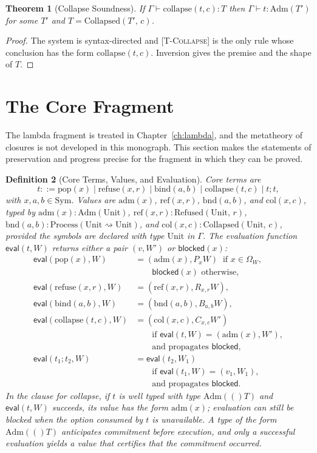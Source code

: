\documentclass[12pt,oneside,openany]{book}
\theoremstyle{spherepop}
\newtheorem{definition}{Definition}[chapter]
\newtheorem{theorem}[definition]{Theorem}
\theoremstyle{remarkstyle}
\newcommand{\Adm}[1]{\mathrm{Adm}(#1)}
\newcommand{\Refused}[2]{\mathrm{Refused}(#1,\,#2)}
\newcommand{\Collapsed}[2]{\mathrm{Collapsed}(#1,\,#2)}
\newcommand{\yields}{\rightsquigarrow}
\newcommand{\Sym}{\mathrm{Sym}}
\newcommand{\eval}{\mathsf{eval}}
\newcommand{\blocked}{\mathsf{blocked}}
\begin{document}
\begin{theorem}[Collapse Soundness]
\label{thm:collapse-soundness}
If $\Gamma\vdash\mathrm{collapse}(t,c):T$ then $\Gamma\vdash t:\Adm{T'}$ for some $T'$ and $T=\Collapsed{T'}{c}$.
\end{theorem}

\begin{proof}
The system is syntax-directed and \textsc{[T-Collapse]} is the only rule whose conclusion has the form $\mathrm{collapse}(t,c)$. Inversion gives the premise and the shape of $T$.
\end{proof}

\section{The Core Fragment}
\label{sec:core}

The lambda fragment is treated in Chapter~\ref{ch:lambda}, and the metatheory of closures is not developed in this monograph. This section makes the statements of preservation and progress precise for the fragment in which they can be proved.

\begin{definition}[Core Terms, Values, and Evaluation]
Core terms are
\[
t::=\mathrm{pop}(x)\mid\mathrm{refuse}(x,r)\mid\mathrm{bind}(a,b)\mid\mathrm{collapse}(t,c)\mid t;t,
\]
with $x,a,b\in\Sym$. Values are $\mathrm{adm}(x)$, $\mathrm{ref}(x,r)$, $\mathrm{bnd}(a,b)$, and $\mathrm{col}(x,c)$, typed by $\mathrm{adm}(x):\Adm{\mathrm{Unit}}$, $\mathrm{ref}(x,r):\Refused{\mathrm{Unit}}{r}$, $\mathrm{bnd}(a,b):\mathrm{Process}(\mathrm{Unit}\yields\mathrm{Unit})$, and $\mathrm{col}(x,c):\Collapsed{\mathrm{Unit}}{c}$, provided the symbols are declared with type $\mathrm{Unit}$ in $\Gamma$. The evaluation function $\eval(t,W)$ returns either a pair $(v,W')$ or $\blocked(x)$:
\begin{align*}
\eval(\mathrm{pop}(x),W)&=(\mathrm{adm}(x),P_xW)\ \text{ if }x\in\Omega_W,\\ &\qquad\blocked(x)\text{ otherwise},\\
\eval(\mathrm{refuse}(x,r),W)&=(\mathrm{ref}(x,r),R_{x,r}W),\\
\eval(\mathrm{bind}(a,b),W)&=(\mathrm{bnd}(a,b),B_{a,b}W),\\
\eval(\mathrm{collapse}(t,c),W)&=(\mathrm{col}(x,c),C_{x,c}W')\\ &\qquad\text{if }\eval(t,W)=(\mathrm{adm}(x),W'),\\ &\qquad\text{and propagates }\blocked,\\
\eval(t_1;t_2,W)&=\eval(t_2,W_1)\\ &\qquad\text{if }\eval(t_1,W)=(v_1,W_1),\\ &\qquad\text{and propagates }\blocked.
\end{align*}
In the clause for collapse, if $t$ is well typed with type $\Adm(T)$ and $\eval(t,W)$ succeeds, its value has the form $\mathrm{adm}(x)$; evaluation can still be blocked when the option consumed by $t$ is unavailable. A type of the form $\Adm(T)$ anticipates commitment before execution, and only a successful evaluation yields a value that certifies that the commitment occurred.
\end{definition}
\end{document}
